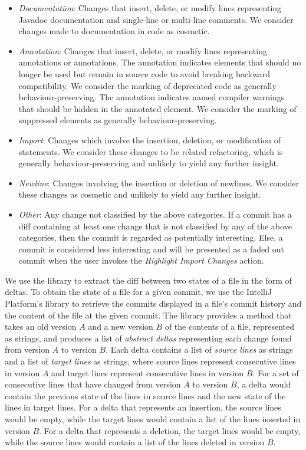 \begin{itemize}
    \item \textit{Documentation}: Changes that insert, delete, or modify lines representing Javadoc documentation and single-line or multi-line comments. We consider changes made to documentation in code as cosmetic.
    \item \textit{Annotation}: \sloppy Changes that insert, delete, or modify lines representing  annotations or  annotations. The  annotation indicates elements that should no longer be used but remain in source code to avoid breaking backward compatibility. We consider the marking of deprecated code as generally behaviour-preserving. The  annotation indicates named compiler warnings that should be hidden in the annotated element. We consider the marking of  suppressed elements as generally behaviour-preserving.
    \item \textit{Import}: Changes which involve the insertion, deletion, or modification of  statements. We consider these changes to be related refactoring, which is generally behaviour-preserving and unlikely to yield any further insight.
    \item \textit{Newline}: Changes involving the insertion or deletion of newlines. We consider these changes as cosmetic and unlikely to yield any further insight.
    \item \textit{Other}: Any change not classified by the above categories. If a commit has a diff containing at least one change that is not classified by any of the above categories, then the commit is regarded as potentially interesting. Else, a commit is considered less interesting and will be presented as a faded out commit when the user invokes the \emph{Highlight Import Changes} action.
\end{itemize}

We use the  \cite{java-diff-utils} library to extract the diff between two states of a file in the form of deltas. 
To obtain the state of a file for a given commit, we use the IntelliJ Platform's  library to retrieve the commits displayed in a file's commit history and the content of the file at the given commit.
The  library provides a method that takes an old version $A$ and a new version $B$ of the contents of a file, represented as strings, and produces a list of \emph{abstract deltas} representing each change found from version $A$ to version $B$. 
Each delta contains a list of \emph{source lines} as strings and a list of \emph{target lines} as strings, where source lines represent consecutive lines in version $A$ and target lines represent consecutive lines in version $B$. 
For a set of consecutive lines that have changed from version $A$ to version $B$, a delta would contain the previous state of the lines in source lines and the new state of the lines in target lines.
For a delta that represents an insertion, the source lines would be empty, while the target lines would contain a list of the lines inserted in version $B$.
For a delta that represents a deletion, the target lines would be empty, while the source lines would contain a list of the lines deleted in version $B$.

